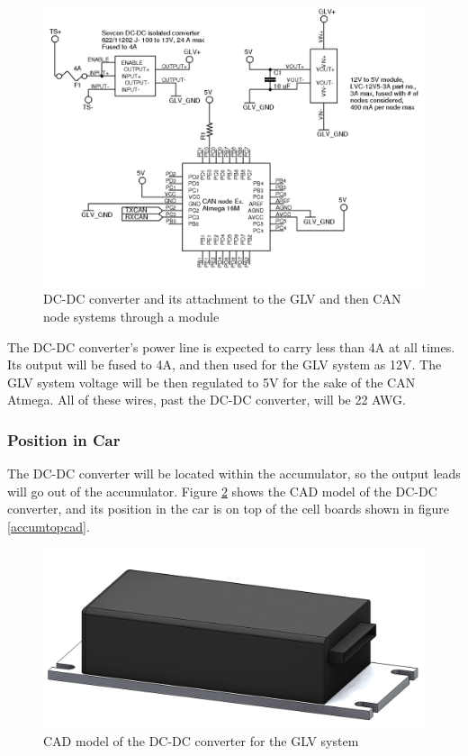 \documentclass{article}
\begin{document}
            \begin{figure}[H]
                \centering
                \includegraphics{CANnodepower}
                \caption{DC-DC converter and its attachment to the GLV and then CAN node systems through a module}
                \label{dc-dcglv}
            \end{figure}
            
            The DC-DC converter's power line is expected to carry less than 4A at all times. Its output will be fused to 4A, and then used for the GLV system as 12V. The GLV system voltage will be then regulated to 5V for the sake of the CAN Atmega. All of these wires, past the DC-DC converter, will be 22 AWG. 

        \subsubsection{Position in Car}
        
            The DC-DC converter will be located within the accumulator, so the output leads will go out of the accumulator. Figure \ref{dcdc_cad} shows the CAD model of the DC-DC converter, and its position in the car is on top of the cell boards shown in figure \ref{accumtopcad}.

            \begin{figure}[H]
                \centering
                \includegraphics[width = 0.6 \textwidth]{GLV_DCDC}
                \caption{CAD model of the DC-DC converter for the GLV system}
                \label{dcdc_cad}
            \end{figure}
\end{document}

